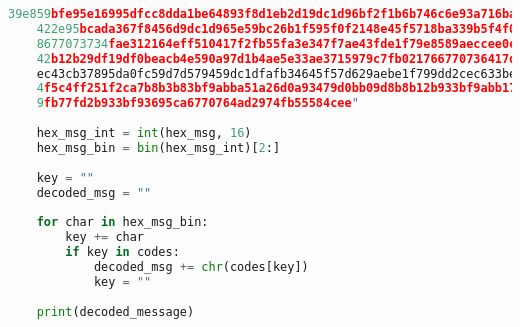 \documentclass[11pt, nopagenumbers]{adamblan-hw}
\begin{document}
\begin{lstlisting}[language=Python]
    39e859bfe95e16995dfcc8dda1be64893f8d1eb2d19dc1d96bf2f1b6b746c6e93a716ba3eacb \\
    422e95bcada367f8456d9dc1d965e59bc26b1f595f0f2148e45f5718ba339b5f4f01483fa16a \\
    8677073734fae312164eff510417f2fb55fa3e347f7ae43fde1f79e8589aeccee0e6e51ff2cf \\
    42b12b29df19df0beacb4e590a97d1b4ae5e33ae3715979c7fb021766770736417d9a2270d84 \\
    ec43cb37895da0fc59d7d579459dc1dfafb34645f57d629aebe1f799dd2cec633be922f07a16 \\
    4f5c4ff251f2ca7b8b3b83bf9abba51a26d0a93479d0bb09d8b8b12b933bf9abb171733b83bf \\
    9fb77fd2b933bf93695ca6770764ad2974fb55584cee"
    
    hex_msg_int = int(hex_msg, 16)
    hex_msg_bin = bin(hex_msg_int)[2:]
    
    key = ""
    decoded_msg = ""
    
    for char in hex_msg_bin:
        key += char
        if key in codes:
            decoded_msg += chr(codes[key])
            key = ""
    
    print(decoded_message)
    
\end{lstlisting}
\end{document}
